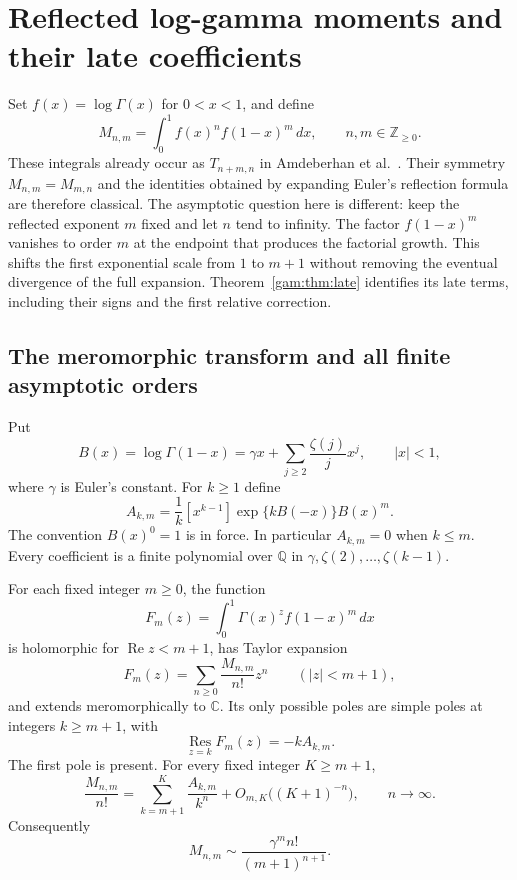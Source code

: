 \section{Reflected log-gamma moments and their late coefficients}
\label{sec:reflected-moments}

Set $f(x)=\log\Gamma(x)$ for $0<x<1$, and define
\[
 M_{n,m}=\int_0^1 f(x)^n f(1-x)^m\,dx,
 \qquad n,m\in\mathbb Z_{\ge0}.
\]
These integrals already occur as $T_{n+m,n}$ in
Amdeberhan et al.\ \cite[Section~5]{ACEMKM}.  Their symmetry
$M_{n,m}=M_{m,n}$ and the identities obtained by expanding Euler's
reflection formula are therefore classical.  The asymptotic question here
is different: keep the reflected exponent $m$ fixed and let $n$ tend to
infinity.  The factor $f(1-x)^m$ vanishes to order $m$ at the endpoint
that produces the factorial growth.  This shifts the first exponential
scale from $1$ to $m+1$ without removing the eventual divergence of the
full expansion.  Theorem~\ref{gam:thm:late} identifies its late terms,
including their signs and the first relative correction.

\subsection{The meromorphic transform and all finite asymptotic orders}

Put
\[
 B(x)=\log\Gamma(1-x)
 =\gamma x+\sum_{j\ge2}\frac{\zeta(j)}j x^j,
 \qquad |x|<1,
\]
where $\gamma$ is Euler's constant.  For $k\ge1$ define
\begin{equation}\label{gam:eq:residue-coefficients}
 A_{k,m}=\frac1k[x^{k-1}]\exp\{kB(-x)\}B(x)^m.
\end{equation}
The convention $B(x)^0=1$ is in force.  In particular $A_{k,m}=0$
when $k\le m$.  Every coefficient is a finite polynomial over
$\mathbb Q$ in $\gamma,\zeta(2),\ldots,\zeta(k-1)$.

\begin{theorem}\label{gam:thm:expansion}
For each fixed integer $m\ge0$, the function
\[
 F_m(z)=\int_0^1\Gamma(x)^z f(1-x)^m\,dx
\]
is holomorphic for $\operatorname{Re}z<m+1$, has Taylor expansion
\[
 F_m(z)=\sum_{n\ge0}\frac{M_{n,m}}{n!}z^n
 \qquad (|z|<m+1),
\]
and extends meromorphically to $\mathbb C$.  Its only possible poles
are simple poles at integers $k\ge m+1$, with
\begin{equation}\label{gam:eq:poles}
 \operatorname*{Res}_{z=k}F_m(z)=-kA_{k,m}.
\end{equation}
The first pole is present.  For every fixed integer $K\ge m+1$,
\begin{equation}\label{gam:eq:fixed-expansion}
 \frac{M_{n,m}}{n!}
 =\sum_{k=m+1}^{K}\frac{A_{k,m}}{k^n}
   +O_{m,K}\bigl((K+1)^{-n}\bigr),\qquad n\longrightarrow\infty.
\end{equation}
Consequently
\begin{equation}\label{gam:eq:leading}
 M_{n,m}\sim \frac{\gamma^m n!}{(m+1)^{n+1}}.
\end{equation}
\end{theorem}

